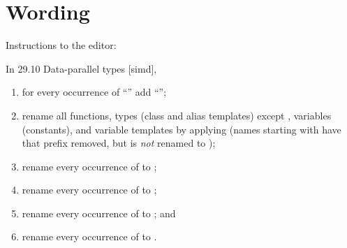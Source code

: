 \section{Wording}\label{sec:wording}

Instructions to the editor:

In 29.10 Data-parallel types [simd],
\begin{enumerate}
  \item
    for every occurrence of “” add “”;

  \item
    rename all functions, types (class and alias templates) except
    , variables (constants), and variable templates by applying
     (names starting with  have that
     prefix removed, but  is \emph{not} renamed to
  );

  \item rename every occurrence of  to ;
  \item rename every occurrence of  to ;
  \item rename every occurrence of  to ; and
  \item rename every occurrence of  to .
\end{enumerate}

